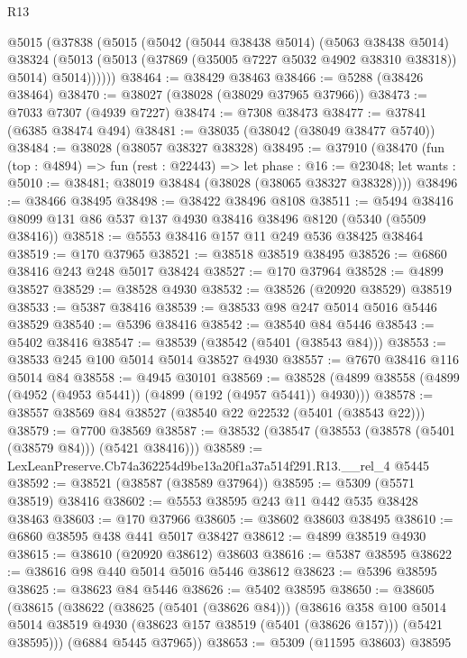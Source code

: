 \begin{lexlean}{R13}
\begin{coremodule}
      @5015
        (@37838
          (@5015
            (@5042
              (@5044 @38438 @5014)
              (@5063 @38438 @5014)
              @38324
              (@5013 (@5013 (@37869 (@35005 @7227 @5032 @4902 @38310 @38318)) @5014) @5014))))))
@38464 := @38429 @38463
@38466 := @5288 (@38426 @38464)
@38470 := @38027 (@38028 (@38029 @37965 @37966))
@38473 := @7033 @7307 (@4939 @7227)
@38474 := @7308 @38473
@38477 := @37841 (@6385 @38474 @494)
@38481 := @38035 (@38042 (@38049 @38477 @5740))
@38484 := @38028 (@38057 @38327 @38328)
@38495 := @37910
    (@38470
      (fun (top : @4894) =>
      fun (rest : @22443) =>
      let phase : @16 := @23048;
      let wants : @5010 := @38481; @38019 @38484 (@38028 (@38065 @38327 @38328))))
@38496 := @38466 @38495
@38498 := @38422 @38496 @8108
@38511 := @5494 @38416 @8099 @131 @86 @537 @137 @4930 @38416 @38496 @8120 (@5340 (@5509 @38416))
@38518 := @5553 @38416 @157 @11 @249 @536 @38425 @38464
@38519 := @170 @37965
@38521 := @38518 @38519 @38495
@38526 := @6860 @38416 @243 @248 @5017 @38424
@38527 := @170 @37964
@38528 := @4899 @38527
@38529 := @38528 @4930
@38532 := @38526 (@20920 @38529) @38519
@38533 := @5387 @38416
@38539 := @38533 @98 @247 @5014 @5016 @5446 @38529
@38540 := @5396 @38416
@38542 := @38540 @84 @5446
@38543 := @5402 @38416
@38547 := @38539 (@38542 (@5401 (@38543 @84)))
@38553 := @38533 @245 @100 @5014 @5014 @38527 @4930
@38557 := @7670 @38416 @116 @5014 @84
@38558 := @4945 @30101
@38569 := @38528 (@4899 @38558 (@4899 (@4952 (@4953 @5441)) (@4899 (@192 (@4957 @5441)) @4930)))
@38578 := @38557 @38569 @84 @38527 (@38540 @22 @22532 (@5401 (@38543 @22)))
@38579 := @7700 @38569
@38587 := @38532 (@38547 (@38553 (@38578 (@5401 (@38579 @84))) (@5421 @38416)))
@38589 := LexLeanPreserve.Cb74a362254d9be13a20f1a37a514f291.R13.__rel_4 @5445
@38592 := @38521 (@38587 (@38589 @37964))
@38595 := @5309 (@5571 @38519) @38416
@38602 := @5553 @38595 @243 @11 @442 @535 @38428 @38463
@38603 := @170 @37966
@38605 := @38602 @38603 @38495
@38610 := @6860 @38595 @438 @441 @5017 @38427
@38612 := @4899 @38519 @4930
@38615 := @38610 (@20920 @38612) @38603
@38616 := @5387 @38595
@38622 := @38616 @98 @440 @5014 @5016 @5446 @38612
@38623 := @5396 @38595
@38625 := @38623 @84 @5446
@38626 := @5402 @38595
@38650 := @38605
    (@38615
      (@38622
        (@38625 (@5401 (@38626 @84)))
        (@38616
          @358
          @100
          @5014
          @5014
          @38519
          @4930
          (@38623 @157 @38519 (@5401 (@38626 @157)))
          (@5421 @38595)))
      (@6884 @5445 @37965))
@38653 := @5309 (@11595 @38603) @38595

\end{coremodule}
\end{lexlean}
